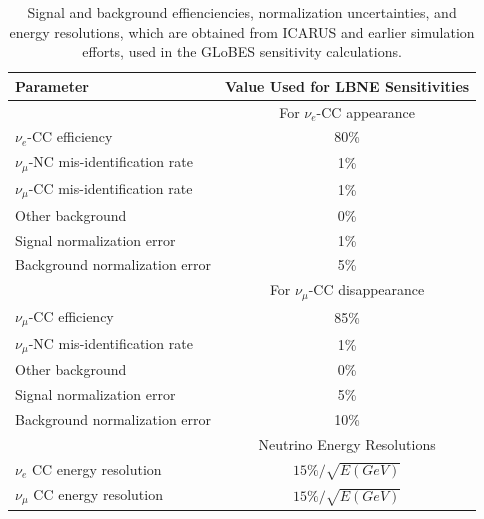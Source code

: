 \documentclass[letterpaper,11pt]{article}
\begin{document}
%
\begin{table}[!htb]
\caption{Signal and background effienciencies, normalization uncertainties, and
  energy resolutions, 
  which are obtained from ICARUS and earlier simulation efforts, used in the GLoBES 
  sensitivity calculations.}
\label{tab:lar-nuosc-totaltable}
\begin{center}
\begin{tabular}{l|c}
\hline \hline
Parameter & Value Used for  LBNE Sensitivities\\  \hline\hline
& For $\nu_e$-CC appearance \\ \hline
$\nu_e$-CC efficiency          & 80\%   \\ 
$\nu_\mu$-NC mis-identification rate  & 1\%   \\ 
$\nu_\mu$-CC mis-identification rate  & 1\%   \\ 
Other background                 & 0\% \\ 
Signal normalization error       & 1\% \\ 
Background normalization error   & 5\% \\  \hline
& For $\nu_\mu$-CC disappearance \\ \hline
$\nu_\mu$-CC efficiency          & 85\%   \\ 
$\nu_\mu$-NC mis-identification rate  & 1\%   \\ 
Other background                 & 0\% \\ 
Signal normalization error       & 5\% \\ 
Background normalization error   & 10\% \\ \hline
& Neutrino Energy Resolutions \\ \hline
$\nu_e$ CC energy resolution & $15\%/\sqrt{E(GeV)}$ \\
$\nu_{\mu}$ CC energy resolution & $15\%/\sqrt{E(GeV)}$ \\ \hline
\end{tabular}
\end{center} 
\end{table}
%
\end{document}
